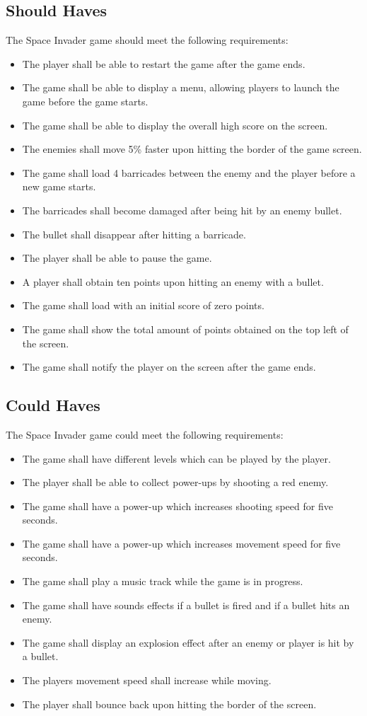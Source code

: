 \subsection{Should Haves}
The Space Invader game should meet the following requirements:
\begin{itemize}
	\item The player shall be able to restart the game after the game ends.
	\item The game shall be able to display a menu, allowing players to launch the game before the game starts.
	\item The game shall be able to display the overall high score on the screen.
	\item The enemies shall move 5\% faster upon hitting the border of the game screen.
	\item The game shall load 4 barricades between the enemy and the player before a new game starts.
	\item The barricades shall become damaged after being hit by an enemy bullet.
	\item The bullet shall disappear after hitting a barricade.
	\item The player shall be able to pause the game.
	\item A player shall obtain ten points upon hitting an enemy with a bullet.
	\item The game shall load with an initial score of zero points.
	\item The game shall show the total amount of points obtained on the top left of the screen.	
	\item The game shall notify the player on the screen after the game ends.	
\end{itemize}

\subsection{Could Haves}
The Space Invader game could meet the following requirements:
\begin{itemize}
	\item The game shall have different levels which can be played by the player.
	\item The player shall be able to collect power-ups by shooting a red enemy.
	\item The game shall have a power-up which increases shooting speed for five seconds.
	\item The game shall have a power-up which increases movement speed for five seconds.
	\item The game shall play a music track while the game is in progress.
	\item The game shall have sounds effects if a bullet is fired and if a bullet hits an enemy.
	\item The game shall display an explosion effect after an enemy or player is hit by a bullet.
	\item The players movement speed shall increase while moving.
	\item The player shall bounce back upon hitting the border of the screen.
\end{itemize}

